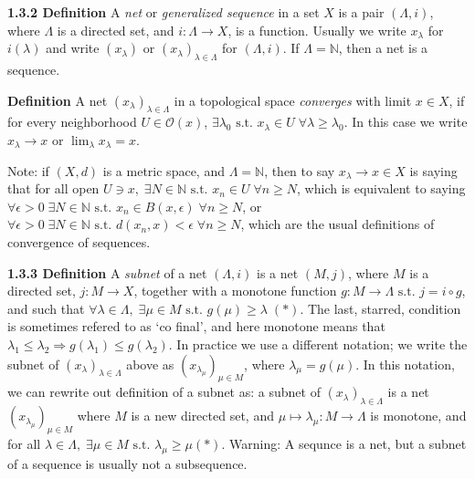 \documentclass[12pt]{article}
\newcommand{\st}[0]{ \textrm{ s.t. } }
\newcommand{\rimply}[0] { \Rightarrow }
\newcommand{\rarw}[0] { \rightarrow }
\newcommand{\nats}[0] { \mathbb{N}}
\newcommand{\eps}[0] {  \epsilon }
\newcommand{\curlyO}[0] { \mathcal{O} }
\begin{document}
\begin{flushleft} {\bf 1.3.2 Definition} A \emph{net} or \emph{generalized sequence} in a set $X$ is a pair $(\Lambda, i)$, where $\Lambda$ is a directed set, and $i: \Lambda \rarw X$, is a function. Usually we write $x_\lambda$ for $i(\lambda)$ and write $(x_\lambda)$ or $(x_\lambda)_{\lambda \in \Lambda}$ for $(\Lambda, i)$. If $\Lambda = \nats$, then a net is a sequence.
\end{flushleft}

\begin{flushleft} {\bf Definition} A net $(x_\lambda)_{\lambda \in \Lambda}$ in a topological space \emph{converges} with limit $x \in X$, if for every neighborhood $U \in \curlyO(x)$, $\exists \lambda_0 \st x_\lambda \in U \; \forall \lambda \ge \lambda_0$. In this case we write $x_\lambda \rarw x$ or $\lim_\lambda x_\lambda = x$.
\end{flushleft}

\begin{flushleft} Note: if $(X, d)$ is a metric space, and $\Lambda = \nats$, 
then to say $x_\lambda \rarw x \in X$ is saying that for all open 
$U \ni x, \; \exists N \in \nats \st x_n \in U \; \forall n \ge N$, which is equivalent to saying $\forall \eps > 0 \; \exists N \in \nats \st x_n \in B(x,\eps) \; \forall n \ge N$, or $\forall \eps > 0 \; \exists N \in \nats \st d(x_n, x) < \eps \; \forall n \ge N$, which are the usual definitions of convergence of sequences.
\end{flushleft}

\begin{flushleft} {\bf 1.3.3 Definition} A \emph{subnet} of a net $(\Lambda, i)$ is a net $(M, j)$, where $M$ is a directed set, $j: M \rarw X$, together with a  monotone function $g: M \rarw \Lambda \st j = i \circ g$, and such that $\forall \lambda \in \Lambda, \; \exists \mu \in M \st g(\mu) \ge \lambda \; (*)$. The last, starred, condition is sometimes refered to as `co final', and here monotone means that $\lambda_1 \le \lambda_2 \rimply g(\lambda_1) \le g(\lambda_2)$. In practice we use a different notation; we write the subnet of $(x_\lambda)_{\lambda \in \Lambda}$ above as $(x_{\lambda_\mu}) _{\mu \in M}$, where $\lambda_\mu = g(\mu)$. In this notation, we can rewrite out definition of a subnet as: a subnet of $(x_\lambda)_{\lambda \in \Lambda}$ is a net $(x_{\lambda_\mu})_{\mu \in M}$ where $M$ is a new directed set, and $\mu \mapsto \lambda_\mu: M \rarw \Lambda$ is monotone, and for all $\lambda \in \Lambda, \; \exists \mu \in M \st \lambda_\mu \ge \mu (*)$. Warning: A sequnce is a net, but a subnet of a sequence is usually not a subsequence.
\end{flushleft}
\end{document}
